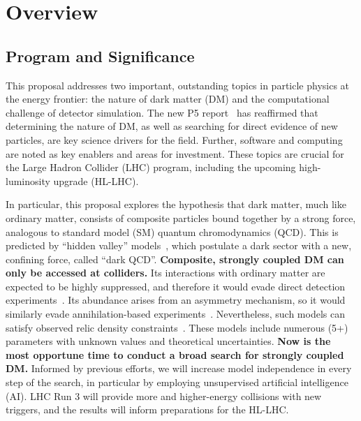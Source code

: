 \section{Overview}\label{sec:intro}

\subsection{Program and Significance}\label{subsec:program}

This proposal addresses two important, outstanding topics in particle physics at the energy frontier:
the nature of dark matter (DM) and the computational challenge of detector simulation.
The new P5 report~\cite{P5:2023} has reaffirmed that determining the nature of DM,
as well as searching for direct evidence of new particles, are key science drivers for the field.
Further, software and computing are noted as key enablers and areas for investment.
These topics are crucial for the Large Hadron Collider (LHC) program,
including the upcoming high-luminosity upgrade (HL-LHC).

In particular, this proposal explores the hypothesis that dark matter, much like ordinary matter,
consists of composite particles bound together by a strong force, analogous to standard model (SM) quantum chromodynamics (QCD).
This is predicted by ``hidden valley'' models~\cite{Strassler:2006im}, which postulate a dark sector with a new, confining force, called ``dark QCD''.
\textbf{Composite, strongly coupled DM can only be accessed at colliders.}
Its interactions with ordinary matter are expected to be highly suppressed,
and therefore it would evade direct detection experiments~\cite{Cohen:2017pzm}.
Its abundance arises from an asymmetry mechanism, so it would similarly evade annihilation-based experiments~\cite{Petraki:2013wwa}.
Nevertheless, such models can satisfy observed relic density constraints~\cite{Beauchesne:2018myj,Beauchesne:2019ato}.
These models include numerous (5+) parameters with unknown values and theoretical uncertainties.
\textbf{Now is the most opportune time to conduct a broad search for strongly coupled DM.}
Informed by previous efforts, we will increase model independence in every step of the search,
in particular by employing unsupervised artificial intelligence (AI).
LHC Run 3 will provide more and higher-energy collisions with new triggers,
and the results will inform preparations for the HL-LHC.

